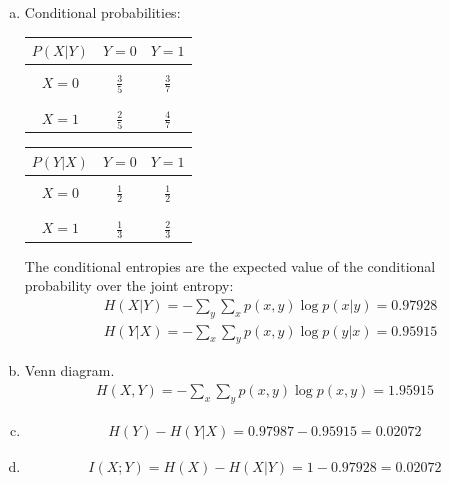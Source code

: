 \documentclass[12pt, letterpaper]{scrartcl}
\begin{document}
\begin{enumerate}[a.]
    \item Conditional probabilities:
    \begin{center}
        \begin{tabular}{c|c|c}
            $P(X|Y)$    & $Y=0$             & $Y=1$        \\ \hline 
            &\\[-1em]
            $X=0$ & $\frac{3}{5}$ & $\frac{3}{7}$   \\ 
            &\\[-1em]
            \hline
            \\[-1em]
            $X=1$ & $\frac{2}{5}$ & $\frac{4}{7}$   \\
        \end{tabular}
        \qquad
        \begin{tabular}{c|c|c}
            $P(Y|X)$    & $Y=0$             & $Y=1$        \\ \hline 
            &\\[-1em]
            $X=0$ & $\frac{1}{2}$ & $\frac{1}{2}$   \\ 
            &\\[-1em]
            \hline
            \\[-1em]
            $X=1$ & $\frac{1}{3}$ & $\frac{2}{3}$   \\
        \end{tabular}
    \end{center}
    The conditional entropies are the expected value of the conditional probability over the joint entropy:
    \begin{align*}
        &H(X|Y)=-\sum_{y}\sum_{x} p(x,y)\log p(x|y)=0.97928\\
        &H(Y|X)=-\sum_{x}\sum_{y} p(x,y)\log p(y|x)=0.95915
    \end{align*}
    
    \item Venn diagram.
    \begin{align*}
        H(X,Y)=-\sum_{x}\sum_{y} p(x,y)\log p(x,y)=1.95915
    \end{align*}
    
    \item
    \begin{align*}
        H(Y)-H(Y|X)=0.97987-0.95915=0.02072
    \end{align*}
    
    \item
    \begin{align*}
        I(X;Y)=H(X)-H(X|Y)=1-0.97928=0.02072
    \end{align*}
    

\end{enumerate}
\end{document}
